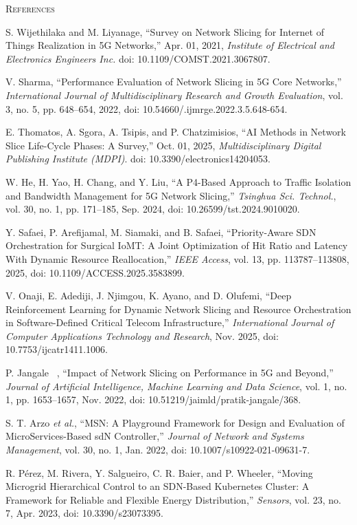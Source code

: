 \textsc{References}

\cite{b1} S. Wijethilaka and M. Liyanage, ``Survey on Network Slicing for Internet of Things Realization in 5G Networks,'' Apr. 01, 2021, \emph{Institute of Electrical and Electronics Engineers Inc.} doi: 10.1109/COMST.2021.3067807.

\cite{b2} V. Sharma, ``Performance Evaluation of Network Slicing in 5G Core Networks,'' \emph{International Journal of Multidisciplinary Research and Growth Evaluation}, vol. 3, no. 5, pp. 648--654, 2022, doi: 10.54660/.ijmrge.2022.3.5.648-654.

\cite{b3} E. Thomatos, A. Sgora, A. Tsipis, and P. Chatzimisios, ``AI Methods in Network Slice Life-Cycle Phases: A Survey,'' Oct. 01, 2025, \emph{Multidisciplinary Digital Publishing Institute (MDPI)}. doi: 10.3390/electronics14204053.

\cite{b4} W. He, H. Yao, H. Chang, and Y. Liu, ``A P4-Based Approach to Traffic Isolation and Bandwidth Management for 5G Network Slicing,'' \emph{Tsinghua Sci. Technol.}, vol. 30, no. 1, pp. 171--185, Sep. 2024, doi: 10.26599/tst.2024.9010020.

\cite{b5} Y. Safaei, P. Arefijamal, M. Siamaki, and B. Safaei, ``Priority-Aware SDN Orchestration for Surgical IoMT: A Joint Optimization of Hit Ratio and Latency With Dynamic Resource Reallocation,'' \emph{IEEE Access}, vol. 13, pp. 113787--113808, 2025, doi: 10.1109/ACCESS.2025.3583899.

\cite{b6} V. Onaji, E. Adediji, J. Njimgou, K. Ayano, and D. Olufemi, ``Deep Reinforcement Learning for Dynamic Network Slicing and Resource Orchestration in Software-Defined Critical Telecom Infrastructure,'' \emph{International Journal of Computer Applications Technology and Research}, Nov. 2025, doi: 10.7753/ijcatr1411.1006.

\cite{b7} P. Jangale~ , ``Impact of Network Slicing on Performance in 5G and Beyond,'' \emph{Journal of Artificial Intelligence, Machine Learning and Data Science}, vol. 1, no. 1, pp. 1653--1657, Nov. 2022, doi: 10.51219/jaimld/pratik-jangale/368.

\cite{b8} S. T. Arzo \emph{et al.}, ``MSN: A Playground Framework for Design and Evaluation of MicroServices-Based sdN Controller,'' \emph{Journal of Network and Systems Management}, vol. 30, no. 1, Jan. 2022, doi: 10.1007/s10922-021-09631-7.

\cite{b9} R. Pérez, M. Rivera, Y. Salgueiro, C. R. Baier, and P. Wheeler, ``Moving Microgrid Hierarchical Control to an SDN-Based Kubernetes Cluster: A Framework for Reliable and Flexible Energy Distribution,'' \emph{Sensors}, vol. 23, no. 7, Apr. 2023, doi: 10.3390/s23073395.

